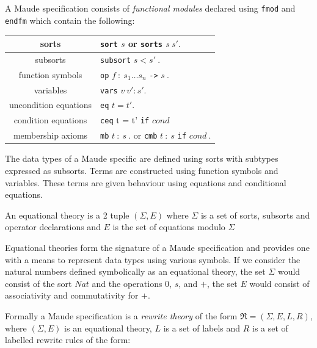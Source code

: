 A Maude specification consists of \emph{functional modules} declared using \texttt{fmod} and \texttt{endfm} which contain the following:

\medskip
\begin{center}
\begin{tabular}{| c | l |}
\hline
sorts    & \texttt{sort} $s$ or \texttt{sorts}  $s \ s' .$ \\ \hline
subsorts  & \texttt{subsort} $s < s' \ .$ \\ \hline
function symbols  & \texttt{op} $f \ :  \ s_1 \ldots s_n$ \texttt{->} $s \ .$ \\ \hline
variables  & \texttt{vars} $v \ v' : s' .$\\ \hline
uncondition equations  &\texttt{eq} $t = t' .$\\ \hline
condition equations & \texttt{ceq} t = t' \texttt{if} $cond$ \\ \hline
membership axioms & \texttt{mb} $t \ : \ s \ .$ or \texttt{cmb} $t  \ : \ s$ \texttt{if} $cond \ .$  \\ \hline
\end{tabular}
\end{center}

The data types of a Maude specific are defined using sorts with subtypes expressed as subsorts. Terms are constructed using function symbols and variables. These terms are given behaviour using equations and conditional equations.  
\medskip
\begin{mydef}
An equational theory is a 2 tuple $(\Sigma, E)$ where $\Sigma$ is a set of sorts, subsorts and operator declarations  and $E$ is the set of equations modulo $\Sigma$
\end{mydef}

Equational theories  form the signature of a Maude specification and provides one with a means to represent data types using various symbols. If we consider the natural numbers defined symbolically  as an equational theory, the set $\Sigma$ would consist of the sort $Nat$ and the operations $0$, $s$, and $+$, the set $E$ would consist of associativity and commutativity for $+$.

Formally a Maude specification is a \emph{rewrite theory} of the form $\mathfrak{R}=(\Sigma,E,L,R)$, where  $(\Sigma, E)$ is an equational theory, $L$ is a set of labels and $R$ is a set of labelled rewrite rules of the form:

